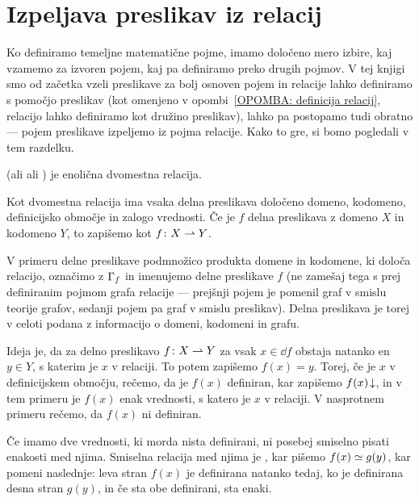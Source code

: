 

        \section{Izpeljava preslikav iz relacij}\label{RAZDELEK: Izpeljava preslikav iz relacij}

                Ko definiramo temeljne matematične pojme, imamo določeno mero izbire, kaj vzamemo za izvoren pojem, kaj pa definiramo preko drugih pojmov. V tej knjigi smo od začetka vzeli preslikave za bolj osnoven pojem in relacije lahko definiramo s pomočjo preslikav (kot omenjeno v opombi~\ref{OPOMBA: definicija relacij}, relacijo lahko definiramo kot družino preslikav), lahko pa postopamo tudi obratno --- pojem preslikave izpeljemo iz pojma relacije. Kako to gre, si bomo pogledali v tem razdelku.

                \begin{definicija}
                         (ali  ali ) je enolična dvomestna relacija.
                \end{definicija}

                Kot dvomestna relacija ima vsaka delna preslikava določeno domeno, kodomeno, definicijsko območje in zalogo vrednosti. Če je $f$ delna preslikava z domeno $X$ in kodomeno $Y$, to zapišemo kot $f\colon X \mathrel{\rightharpoonup} Y$.

                V primeru delne preslikave podmnožico produkta domene in kodomene, ki določa relacijo, označimo z $\Gamma_{f}$ in imenujemo  delne preslikave $f$ (ne zamešaj tega s prej definiranim pojmom grafa relacije --- prejšnji pojem je pomenil graf v smislu teorije grafov, sedanji pojem pa graf v smislu preslikav). Delna preslikava je torej v celoti podana z informacijo o domeni, kodomeni in grafu.

                Ideja je, da za delno preslikavo $f\colon X \mathrel{\rightharpoonup} Y$ za vsak $x \in \dd{f}$ obstaja natanko en $y \in Y$, s katerim je $x$ v relaciji. To potem zapišemo $f(x) = y$. Torej, če je $x$ v definicijskem območju, rečemo, da je $f(x)$ definiran, kar zapišemo ${f(x)}\!\downarrow$, in v tem primeru je $f(x)$ enak vrednosti, s katero je $x$ v relaciji. V nasprotnem primeru rečemo, da $f(x)$ ni definiran.

                Če imamo dve vrednosti, ki morda nista definirani, ni posebej smiselno pisati enakosti med njima. Smiselna relacija med njima je , kar pišemo $f(x) \simeq g(y)$, kar pomeni naslednje: leva stran $f(x)$ je definirana natanko tedaj, ko je definirana desna stran $g(y)$, in če sta obe definirani, sta enaki.

